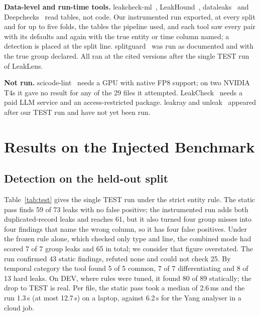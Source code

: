 \documentclass[10pt,a4paper,twocolumn]{article}
\newcommand{\tool}{LeakLens}
\begin{document}
\textbf{Data-level and run-time tools.} leakcheck-ml~\cite{leakcheckml}, LeakHound~\cite{leakhound},
dataleaks~\cite{dataleaks} and Deepchecks~\cite{chorev2022} read tables, not code. Our instrumented run exported,
at every split and for up to five folds, the tables the pipeline used, and each tool saw every pair with its
defaults and again with the true entity or time column named; a detection is placed at the split line.
splitguard~\cite{splitguard} was run as documented and with the true group declared. All ran at the cited versions
after the single TEST run of \tool{}.

\textbf{Not run.} scicode-lint~\cite{samsonau2026} needs a GPU with native FP8 support; on two NVIDIA T4s it gave
no result for any of the 29 files it attempted. LeakCheck~\cite{draoui2026} needs a paid LLM service and an
access-restricted package. leakray and unleak~\cite{leakray,unleak} appeared after our TEST run and have not yet
been run.

\section{Results on the Injected Benchmark}

\subsection{Detection on the held-out split}

Table~\ref{tab:test} gives the single TEST run under the strict entity rule. The static pass finds 59 of 73 leaks
with no false positive; the instrumented run adds both duplicated-record leaks and reaches 61, but it also turned
four group misses into four findings that name the wrong column, so it has four false positives. Under the frozen
rule alone, which checked only type and line, the combined mode had scored 7 of 7 group leaks and 65 in total; we
consider that figure overstated. The run confirmed 43 static findings, refuted none and could not check 25. By
temporal category the tool found 5 of 5 common, 7 of 7 differentiating and 8 of 13 hard leaks. On DEV, where rules
were tuned, it found 80 of 89 statically; the drop to TEST is real. Per file, the static pass took a median of
2.6\,ms and the run 1.3\,s (at most 12.7\,s) on a laptop, against 6.2\,s for the Yang analyser in a cloud job.
\end{document}
